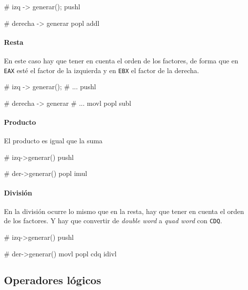 \documentclass[11pt]{scrartcl}
\begin{document}
\begin{gascode}
    # izq -> generar();
    pushl %

    # derecha -> generar   
    popl %
    addl %
\end{gascode}

\paragraph{Resta}

En este caso hay que tener en cuenta el orden de los factores, de forma que en
\texttt{EAX} esté el factor de la izquierda y en \texttt{EBX} el factor de la
derecha.

\begin{gascode}
    # izq -> generar();
    # ...
    pushl %

    # derecha -> generar   
    # ...
    movl %
    popl %
    subl %
\end{gascode}

\paragraph{Producto}

El producto es igual que la suma

\begin{gascode}
    # izq->generar()
    pushl %

    # der->generar()
    popl %
    imul %
\end{gascode}


\paragraph{División}

En la división ocurre lo mismo que en la resta, hay que tener en cuenta el orden
de los factores. Y hay que convertir de \textit{double word} a \textit{quad
  word} con \texttt{CDQ}.

\begin{gascode}
    # izq->generar()
    pushl %

    # der->generar()
    movl %
    popl %
    cdq
    idivl %
\end{gascode}

\subsection{Operadores lógicos}
\end{document}
